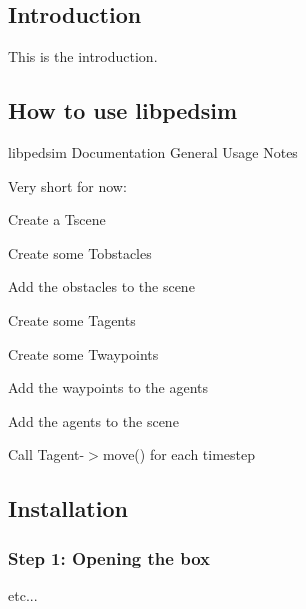 \hypertarget{index_intro_sec}{}\subsection{Introduction}\label{index_intro_sec}
This is the introduction.\hypertarget{index_gen_sec}{}\subsection{How to use libpedsim}\label{index_gen_sec}
libpedsim Documentation General Usage Notes

Very short for now:

Create a Tscene

Create some Tobstacles

Add the obstacles to the scene

Create some Tagents

Create some Twaypoints

Add the waypoints to the agents

Add the agents to the scene

Call Tagent-\/$>$move() for each timestep\hypertarget{index_install_sec}{}\subsection{Installation}\label{index_install_sec}
\hypertarget{index_step1}{}\subsubsection{Step 1: Opening the box}\label{index_step1}
etc... 